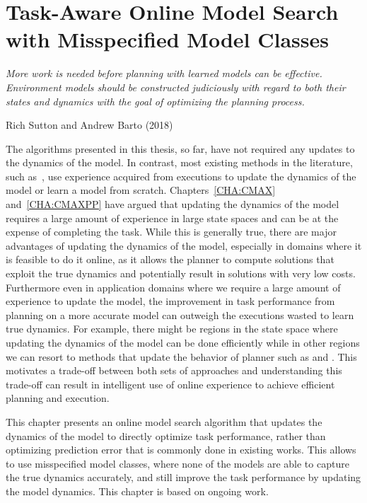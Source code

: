 
\chapter{Task-Aware Online Model Search with Misspecified Model Classes}
\label{CHA:TAML}

\epigraph{\textit{More work is needed before planning with learned
    models can be effective. Environment models should be
    constructed judiciously with regard to both their states and
    dynamics with the goal of optimizing the planning process.}}{Rich
  Sutton and Andrew Barto (2018)}

The algorithms presented in this thesis, so
far, have not required any updates to the dynamics of the model. In
contrast, most existing methods in the literature, such
as~\cite{DBLP:journals/ml/KearnsS02, DBLP:journals/jmlr/BrafmanT02,
  DBLP:conf/atal/JongS07,
  DBLP:journals/pami/DeisenrothFR15, DBLP:conf/icml/AbbeelQN06,
  DBLP:conf/aaai/Jiang18, rastogi2018sample}, use experience
acquired from executions to update the dynamics of the model or learn
a model from scratch.
Chapters~\ref{CHA:CMAX} and~\ref{CHA:CMAXPP} have
argued that updating the dynamics of the model requires a large amount
of experience in large state spaces and can be at the expense of
completing the task. While this is generally true, there are major
advantages of updating the dynamics of the model, especially in
domains where it
is feasible to do it online, as it allows the planner to compute
solutions that exploit the true dynamics and potentially result in
solutions with very low costs. Furthermore even in application domains
where we require a large amount of experience to update the model,
the improvement in task performance from planning on a more accurate
model can outweigh the executions wasted to learn true dynamics. For
example, there might be regions in the state space where updating the
dynamics of the model can be done efficiently while in other regions
we can resort to methods that update the behavior of planner such as
\cmax{} and \cmaxpp{}. This motivates a trade-off between both sets of
approaches and understanding this trade-off can result in intelligent
use of online experience to achieve efficient planning and
execution.

This chapter presents \taml{} an online model search algorithm that updates
the dynamics of the model to directly optimize task performance,
rather than optimizing prediction error that is commonly done in
existing works. This allows \taml{} to use misspecified model classes,
where none of the models are able to capture the true dynamics
accurately, and still improve the task performance by updating the
model dynamics. This chapter is based on ongoing work.

